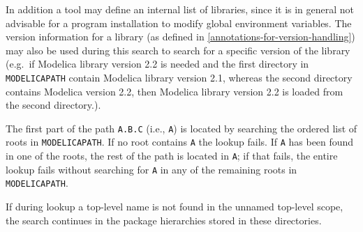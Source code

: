 In addition a tool may define an internal list of libraries, since it is
in general not advisable for a program installation to modify global
environment variables. The version information for a library (as defined
in \cref{annotations-for-version-handling}) may also be used during this search to search for a
specific version of the library (e.g.\ if Modelica library version 2.2 is
needed and the first directory in \lstinline!MODELICAPATH! contain Modelica library
version 2.1, whereas the second directory contains Modelica version 2.2,
then Modelica library version 2.2 is loaded from the second directory.).

\begin{nonnormative}
The first part of the path \lstinline!A.B.C! (i.e., \lstinline!A!) is located by searching the ordered list of roots in \lstinline!MODELICAPATH!.  If no root contains
\lstinline!A! the lookup fails.  If \lstinline!A! has been found in one of the roots, the rest of the path is located in \lstinline!A!; if that fails, the entire lookup
fails without searching for \lstinline!A! in any of the remaining roots in \lstinline!MODELICAPATH!.
\end{nonnormative}

If during lookup a top-level name is not found in the unnamed top-level scope, the search continues in the package hierarchies stored in these directories.

